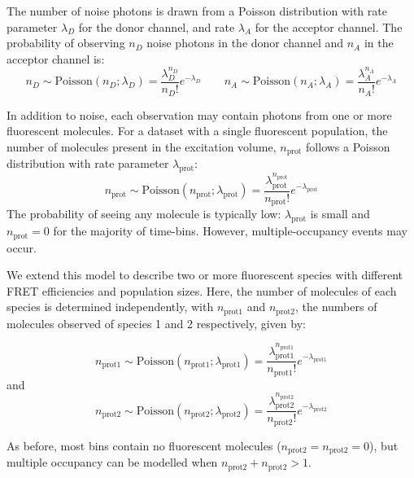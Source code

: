 The number of noise photons is drawn from a Poisson distribution with rate parameter $\lambda_D$ for the donor channel, and rate $\lambda_A$ for the acceptor channel. The probability of observing $n_D$ noise photons in the donor channel and $n_A$ in the acceptor channel is:
\begin{equation}
n_{D} \sim \text{Poisson}(n_{D}; \lambda_{D}) = \frac{\lambda_{D}^{n_{D}}}{n_{D}!}e^{-\lambda_{D}}
\qquad
n_{A} \sim \text{Poisson}(n_{A}; \lambda_{A}) = \frac{\lambda_{A}^{n_{A}}}{n_{A}!}e^{-\lambda_{A}}
\end{equation}

In addition to noise, each observation may contain photons from one or more fluorescent molecules. For a dataset with a single fluorescent population, the number of molecules present in the excitation volume, $n_{\text{prot}}$ follows a Poisson distribution with rate parameter $\lambda_{\text{prot}}$:
\begin{equation}
n_{\text{prot}} \sim \text{Poisson}(n_{\text{prot}}; \lambda_{\text{prot}}) = \frac{\lambda_{\text{prot}}^{n_{\text{prot}}}}{n_{\text{prot}}!}e^{-\lambda_{\text{prot}}}
\label{eq:nprot}
\end{equation}
The probability of seeing any molecule is typically low: $\lambda_{\text{prot}}$ is small and $n_{\text{prot}} = 0$ for the majority of time-bins. However, multiple-occupancy events may occur.

We extend this model to describe two or more fluorescent species with different FRET efficiencies and population sizes. Here, the number of molecules of each species is determined independently, with $n_{\text{prot1}}$ and $n_{\text{prot2}}$, the numbers of molecules observed of species 1 and 2 respectively, given by:

\begin{equation}
n_{\text{prot1}} \sim \text{Poisson}(n_{\text{prot1}}; \lambda_{\text{prot1}}) = \frac{\lambda_{\text{prot1}}^{n_{\text{prot1}}}}{n_{\text{prot1}}!}e^{-\lambda_{\text{prot1}}}
\end{equation}
and
\begin{equation}
n_{\text{prot2}} \sim \text{Poisson}(n_{\text{prot2}}; \lambda_{\text{prot2}}) = \frac{\lambda_{\text{prot2}}^{n_{\text{prot2}}}}{n_{\text{prot2}}!}e^{-\lambda_{\text{prot2}}}
\end{equation}

As before, most bins contain no fluorescent molecules ($n_{\text{prot2}} = n_{\text{prot2}} = 0$), but multiple occupancy can be modelled when $n_{\text{prot2}} + n_{\text{prot2}} >1$.


